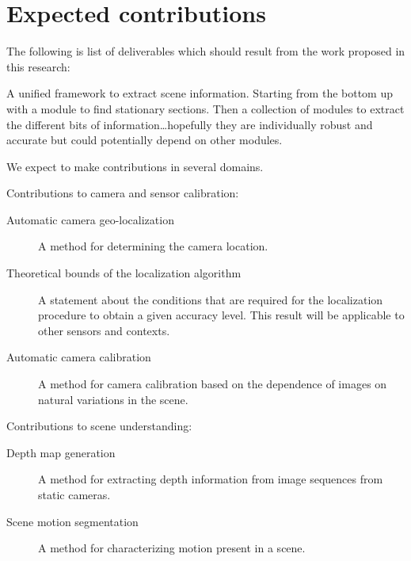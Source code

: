 


\section{Expected contributions}

The following is list of deliverables which should result from the
work proposed in this research:

A unified framework to extract scene information.  Starting from the
bottom up with a module to find stationary sections.  Then a
collection of modules to extract the different bits of
information\ldots hopefully they are individually robust and accurate
but could potentially depend on other modules.

We expect to make contributions in several domains. 

Contributions to camera and sensor calibration:

\begin{description}

\item[Automatic camera geo-localization] A method for determining the
  camera location.

\item[Theoretical bounds of the localization algorithm] A statement
  about the conditions that are required for the localization
  procedure to obtain a given accuracy level.  This result will be
  applicable to other sensors and contexts.

\item[Automatic camera calibration] A method for camera calibration
  based on the dependence of images on natural variations in the
  scene.

\end{description}

Contributions to scene understanding:

\begin{description}

\item[Depth map generation] A method for extracting depth information
  from image sequences from static cameras.

\item[Scene motion segmentation] A method for characterizing motion
  present in a scene.

\end{description}


